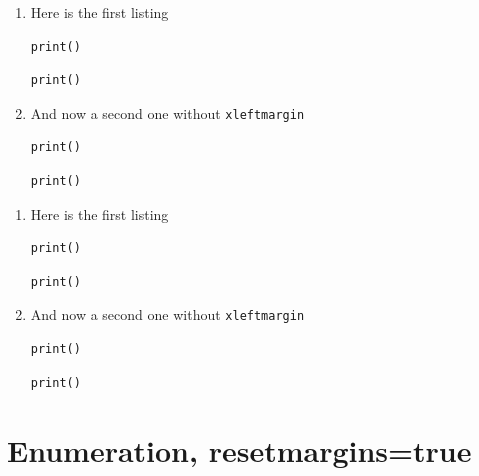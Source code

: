 \documentclass[a4paper,11pt]{article}
\begin{document}
\begin{enumerate}
\item Here is the first listing
\begin{lstlisting}[xleftmargin=30pt,resetmargins=false,caption=Some caption,captionpos=t]
print()
\end{lstlisting}
\begin{lstlisting}[xleftmargin=30pt,resetmargins=false,caption=Some caption,captionpos=b]
print()
\end{lstlisting}

\item And now a second one without \texttt{xleftmargin}
\begin{lstlisting}[xleftmargin=0pt,resetmargins=false,caption=Some caption,captionpos=t]
print()
\end{lstlisting}
\begin{lstlisting}[xleftmargin=0pt,resetmargins=false,caption=Some caption,captionpos=b]
print()
\end{lstlisting}
\end{enumerate}

\captionsetup{box=colorbox,boxcolor=orange!20}

\begin{enumerate}
\item Here is the first listing
\begin{lstlisting}[xleftmargin=30pt,resetmargins=false,caption=Some caption,captionpos=t]
print()
\end{lstlisting}
\begin{lstlisting}[xleftmargin=30pt,resetmargins=false,caption=Some caption,captionpos=b]
print()
\end{lstlisting}

\item And now a second one without \texttt{xleftmargin}
\begin{lstlisting}[xleftmargin=0pt,resetmargins=false,caption=Some caption,captionpos=t]
print()
\end{lstlisting}
\begin{lstlisting}[xleftmargin=0pt,resetmargins=false,caption=Some caption,captionpos=b]
print()
\end{lstlisting}
\end{enumerate}

\clearpage
\section*{Enumeration, resetmargins=true}
\end{document}
